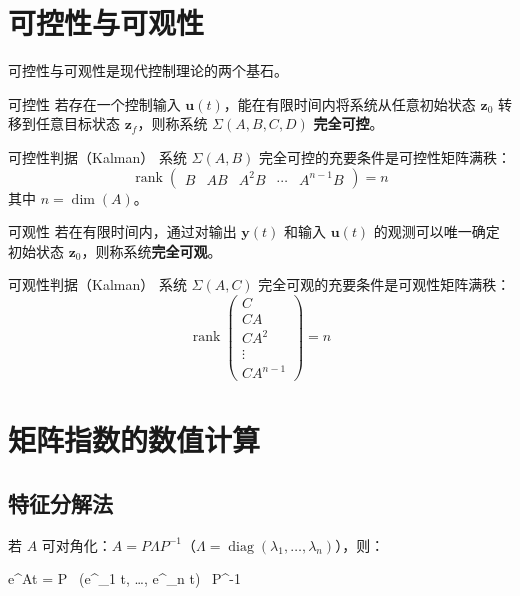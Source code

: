 \section{可控性与可观性}

可控性与可观性是现代控制理论的两个基石。

\begin{mydefinition}{可控性}
	若存在一个控制输入 $\mathbf{u}(t)$，能在有限时间内将系统从任意初始状态 $\mathbf{z}_0$ 转移到任意目标状态 $\mathbf{z}_f$，则称系统 $\Sigma(A,B,C,D)$ \textbf{完全可控}。
\end{mydefinition}

\begin{theorem}{可控性判据（Kalman）}
	系统 $\Sigma(A,B)$ 完全可控的充要条件是可控性矩阵满秩：
	\[
	\operatorname{rank}\begin{pmatrix}
		B & AB & A^2B & \cdots & A^{n-1}B
	\end{pmatrix} = n
	\]
	其中 $n = \dim(A)$。
\end{theorem}

\begin{mydefinition}{可观性}
	若在有限时间内，通过对输出 $\mathbf{y}(t)$ 和输入 $\mathbf{u}(t)$ 的观测可以唯一确定初始状态 $\mathbf{z}_0$，则称系统\textbf{完全可观}。
\end{mydefinition}

\begin{theorem}{可观性判据（Kalman）}
	系统 $\Sigma(A,C)$ 完全可观的充要条件是可观性矩阵满秩：
	\[
	\operatorname{rank}\begin{pmatrix}
		C \\ CA \\ CA^2 \\ \vdots \\ CA^{n-1}
	\end{pmatrix} = n
	\]
\end{theorem}

\section{矩阵指数的数值计算}

\subsection{特征分解法}

若 $A$ 可对角化：$A = P \Lambda P^{-1}$（$\Lambda = \operatorname{diag}(\lambda_1, \ldots, \lambda_n)$），则：
\begin{myformula}
	e^{At} = P \, (e^{\lambda_1 t}, \ldots, e^{\lambda_n t}) \, P^{-1}
\end{myformula}

